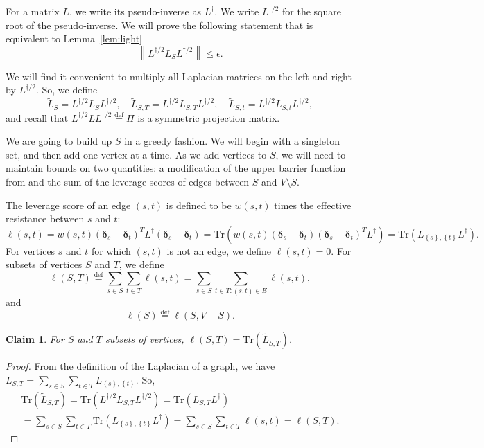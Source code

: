 \documentclass[11pt]{article}
\def\trace#1{\mathrm{Tr} \left(#1 \right)}
\def\Ltil{\widetilde{L}}
\def\norm#1{\left\| #1 \right\|}
\def\ddelta{\boldsymbol{\delta}}
\def\defeq{\stackrel{\mathrm{def}}{=}}
\def\setof#1{\left\{#1  \right\}}
\newtheorem{claim}[theorem]{Claim}
\begin{document}
For a matrix $L$, we write its pseudo-inverse as $L^\dagger$. 
We write $L^{\dagger/2}$ for the square root of the pseudo-inverse.
We will prove the following statement that is equivalent to Lemma~\ref{lem:light}
\[
  \norm{ L^{\dagger/2} L_{S} L^{\dagger/2}} \leq \epsilon .
\]

We will find it convenient to multiply all Laplacian matrices on the left and right by $L^{\dagger/2}$. 
So, we define 
\[
  \Ltil_S = L^{\dagger/2} L_{S} L^{\dagger/2},
  \quad 
  \Ltil_{S,T} = L^{\dagger/2} L_{S,T} L^{\dagger/2},
  \quad 
  \Ltil_{S,t} = L^{\dagger/2} L_{S,t} L^{\dagger/2},
\]
and recall that $L^{\dagger/2} L L^{\dagger/2} \defeq \Pi $ 
  is a symmetric projection matrix.

We are going to build up $S$ in a greedy fashion.
We will begin with a singleton set, and then add one vertex at a time.
As we add vertices to $S$, we will need to maintain bounds on two quantities: a modification of the upper barrier function from \cite{BSS} and the sum of the leverage scores of edges between $S$ and $V \setminus S$. 

The leverage score of an edge $(s,t)$ is defined to be $w(s,t)$ times the effective resistance between $s$ and $t$:
\[
  \ell(s,t  ) = 
  w(s,t) (\ddelta_s - \ddelta_t)^T L^{\dagger} (\ddelta_s - \ddelta_t)
  = \trace{w(s,t) (\ddelta_s - \ddelta_t) (\ddelta_s - \ddelta_t)^T L^{\dagger} }
  = \trace{L_{\setof{s}, \setof{t}} L^{\dagger}}.
\]
For vertices $s$ and $t$ for which $(s,t)$ is not an edge, we define $\ell(s,t) = 0$.
For subsets of vertices $S$ and $T$, we define
\[
  \ell(S,T) \defeq \sum_{s \in S} \sum_{t \in T} \ell(s,t)
  = \sum_{s \in S} \sum_{t \in T : (s,t) \in E} \ell(s,t),
\]
and 
\[
  \ell(S) \defeq \ell(S,V - S).
\]

\begin{claim}\label{clm:ellSt}
For $S$ and $T$ subsets of vertices, $\ell(S, T) = \trace{\Ltil_{S,T}}$.
\end{claim}
\begin{proof}
From the definition of the Laplacian of a graph, we have 
$
  L_{S,T} = \sum_{s \in S} \sum_{t \in T} L_{\setof{s}, \setof{t}}
$.
So, 
\begin{multline*}
  \trace{\Ltil_{S,T}} 
    = \trace{L^{\dagger/2} L_{S,T} L^{\dagger/2} } 
  = \trace{L_{S,T} L^\dagger} \\
= 
\sum_{s \in S} \sum_{t \in T} \trace{ L_{\setof{s}, \setof{t}} L^\dagger }
= 
\sum_{s \in S} \sum_{t \in T} \ell(s,t)
= \ell(S,T).
\end{multline*}
\end{proof}
\end{document}

